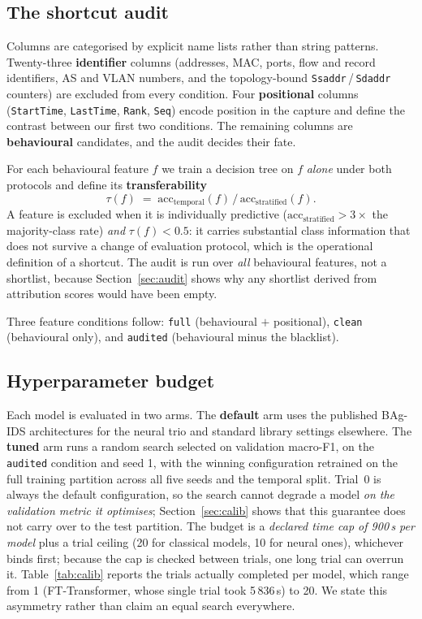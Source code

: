 \documentclass[review,12pt]{elsarticle}
\begin{document}
\subsection{The shortcut audit}
\label{sec:audit-protocol}
Columns are categorised by explicit name lists rather than string patterns. Twenty-three
\textbf{identifier} columns (addresses, MAC, ports, flow and record identifiers, AS and
VLAN numbers, and the topology-bound \texttt{Ssaddr}\,/\,\allowbreak\texttt{Sdaddr}
counters) are
excluded from every condition. Four \textbf{positional} columns (\texttt{StartTime},
\texttt{LastTime}, \texttt{Rank}, \texttt{Seq}) encode position in the capture and define
the contrast between our first two conditions. The remaining columns are
\textbf{behavioural} candidates, and the audit decides their fate.

For each behavioural feature $f$ we train a decision tree on $f$ \emph{alone} under both
protocols and define its \textbf{transferability}
\[
  \tau(f) \;=\; \mathrm{acc}_{\text{temporal}}(f) \,/\, \mathrm{acc}_{\text{stratified}}(f).
\]
A feature is excluded when it is individually predictive
($\mathrm{acc}_{\text{stratified}} > 3\times$ the majority-class rate) \emph{and}
$\tau(f) < 0.5$: it carries substantial class information that does not survive a change
of evaluation protocol, which is the operational definition of a shortcut. The audit is
run over \emph{all} behavioural features, not a shortlist, because
Section~\ref{sec:audit} shows why any shortlist derived from attribution scores would
have been empty.

Three feature conditions follow: \texttt{full} (behavioural $+$ positional),
\texttt{clean} (behavioural only), and \texttt{audited} (behavioural minus the blacklist).

\subsection{Hyperparameter budget}
Each model is evaluated in two arms. The \textbf{default} arm uses the published BAg-IDS
architectures for the neural trio and standard library settings elsewhere. The
\textbf{tuned} arm runs a random search selected on validation macro-F1, on the
\texttt{audited} condition and seed 1, with the winning configuration retrained on the
full training partition across all five seeds and the temporal split. Trial~0 is always
the default configuration, so the search cannot degrade a model \emph{on the validation
metric it optimises}; Section~\ref{sec:calib} shows that this guarantee does not carry
over to the test partition. The budget is a
\emph{declared time cap of 900\,s per model} plus a trial ceiling (20 for classical
models, 10 for neural ones), whichever binds first; because the cap is checked between
trials, one long trial can overrun it. Table~\ref{tab:calib} reports the trials actually
completed per model, which range from 1 (FT-Transformer, whose single trial took
5\,836\,s) to 20. We state this asymmetry rather than claim an equal search everywhere.
\end{document}
